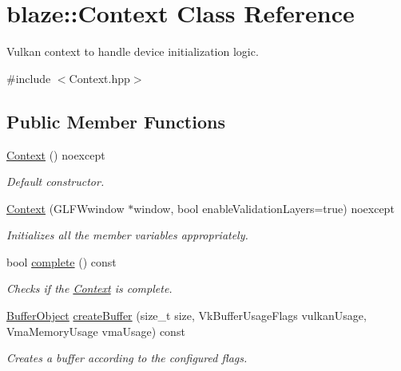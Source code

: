 \hypertarget{classblaze_1_1Context}{}\section{blaze\+:\+:Context Class Reference}
\label{classblaze_1_1Context}


Vulkan context to handle device initialization logic.  




{\ttfamily \#include $<$Context.\+hpp$>$}

\subsection*{Public Member Functions}
\begin{DoxyCompactItemize}
\item 
\mbox{\label{classblaze_1_1Context_aaefe4df05300639358eee7134e6528fd}} 
\hyperlink{classblaze_1_1Context_aaefe4df05300639358eee7134e6528fd}{Context} () noexcept
\begin{DoxyCompactList}\small\item\em Default constructor. \end{DoxyCompactList}\item 
\hyperlink{classblaze_1_1Context_aadc385721ead1b5da60e0fa1a1447d48}{Context} (G\+L\+F\+Wwindow $\ast$window, bool enable\+Validation\+Layers=true) noexcept
\begin{DoxyCompactList}\small\item\em Initializes all the member variables appropriately. \end{DoxyCompactList}\item 
bool \hyperlink{classblaze_1_1Context_a781b839debbaa0c0ffffa3328dc1d9bd}{complete} () const
\begin{DoxyCompactList}\small\item\em Checks if the \hyperlink{classblaze_1_1Context}{Context} is complete. \end{DoxyCompactList}\item 
\hyperlink{structblaze_1_1BufferObject}{Buffer\+Object} \hyperlink{classblaze_1_1Context_ae3d500fa6b216cd92a2b589360bc460f}{create\+Buffer} (size\+\_\+t size, Vk\+Buffer\+Usage\+Flags vulkan\+Usage, Vma\+Memory\+Usage vma\+Usage) const
\begin{DoxyCompactList}\small\item\em Creates a buffer according to the configured flags. \end{DoxyCompactList}\item 

\end{DoxyCompactItemize}
